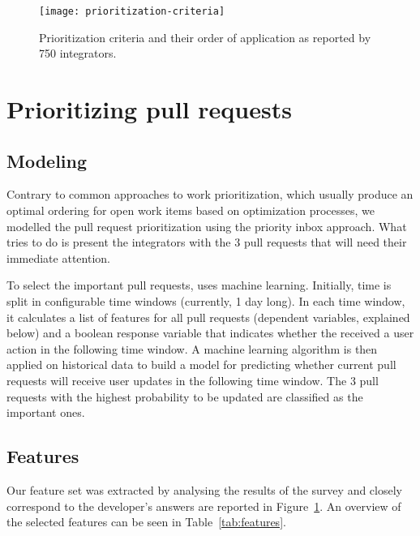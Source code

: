 \documentclass[conference]{IEEEtran}
\begin{document}
\begin{figure}[t]
  \begin{center}
    \texttt{[image: prioritization-criteria]}
  \end{center}
  \caption{Prioritization criteria and their order of application as reported by
  750 integrators.}
  \label{fig:prioritization}
\end{figure}


\section{Prioritizing pull requests}

\subsection{Modeling} Contrary to common approaches to work prioritization, which usually produce
an optimal ordering for open work items based on optimization processes, we
modelled the pull request prioritization using the priority inbox approach.
What \prioritizer tries to do is present the integrators with the 3 pull
requests that will need their immediate attention. 

To select the important pull requests, \prioritizer uses machine learning.
Initially, time is split in configurable time windows (currently, 1 day long).
In each time window, it calculates a list of features for all pull requests
(dependent variables, explained below) and a boolean response variable that
indicates whether the received a user action in the following time window. A
machine learning algorithm is then applied on historical data to build a model
for predicting whether current pull requests will receive user updates in the
following time window. The 3 pull requests with the highest probability to be
updated are classified as the important ones.

\subsection{Features}
\label{sec:features}
Our feature set was extracted by analysing the results of the survey and
closely correspond to the developer's answers are reported in
Figure~\ref{fig:prioritization}. An overview of the selected features can
be seen in Table~\ref{tab:features}.
\end{document}
